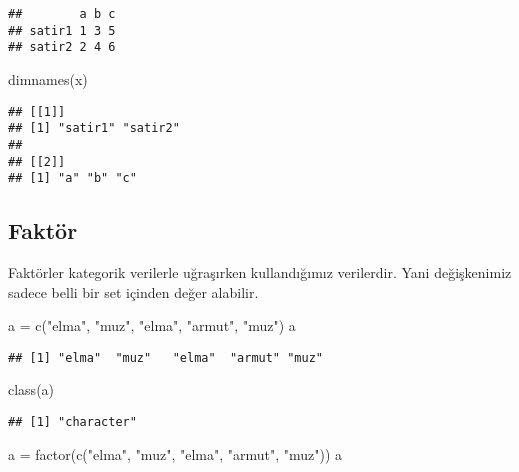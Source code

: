 \documentclass[
]{book}
\newenvironment{Shaded}{\begin{snugshade}}{\end{snugshade}}
\newcommand{\FunctionTok}[1]{\textcolor[rgb]{0.00,0.00,0.00}{#1}}
\newcommand{\NormalTok}[1]{#1}
\newcommand{\OtherTok}[1]{\textcolor[rgb]{0.56,0.35,0.01}{#1}}
\newcommand{\StringTok}[1]{\textcolor[rgb]{0.31,0.60,0.02}{#1}}
\begin{document}
\begin{verbatim}
##        a b c
## satir1 1 3 5
## satir2 2 4 6
\end{verbatim}

\begin{Shaded}
\begin{Highlighting}[]
\FunctionTok{dimnames}\NormalTok{(x)}
\end{Highlighting}
\end{Shaded}

\begin{verbatim}
## [[1]]
## [1] "satir1" "satir2"
## 
## [[2]]
## [1] "a" "b" "c"
\end{verbatim}

\hypertarget{faktuxf6r}{%
\subsection{Faktör}\label{faktuxf6r}}

Faktörler kategorik verilerle uğraşırken kullandığımız verilerdir. Yani değişkenimiz sadece belli bir set içinden değer alabilir.

\begin{Shaded}
\begin{Highlighting}[]
\NormalTok{a }\OtherTok{=}  \FunctionTok{c}\NormalTok{(}\StringTok{"elma"}\NormalTok{, }\StringTok{"muz"}\NormalTok{, }\StringTok{"elma"}\NormalTok{, }\StringTok{"armut"}\NormalTok{, }\StringTok{"muz"}\NormalTok{)}
\NormalTok{a}
\end{Highlighting}
\end{Shaded}

\begin{verbatim}
## [1] "elma"  "muz"   "elma"  "armut" "muz"
\end{verbatim}

\begin{Shaded}
\begin{Highlighting}[]
\FunctionTok{class}\NormalTok{(a)}
\end{Highlighting}
\end{Shaded}

\begin{verbatim}
## [1] "character"
\end{verbatim}

\begin{Shaded}
\begin{Highlighting}[]
\NormalTok{a }\OtherTok{=} \FunctionTok{factor}\NormalTok{(}\FunctionTok{c}\NormalTok{(}\StringTok{"elma"}\NormalTok{, }\StringTok{"muz"}\NormalTok{, }\StringTok{"elma"}\NormalTok{, }\StringTok{"armut"}\NormalTok{, }\StringTok{"muz"}\NormalTok{))}
\NormalTok{a}
\end{Highlighting}
\end{Shaded}
\end{document}
